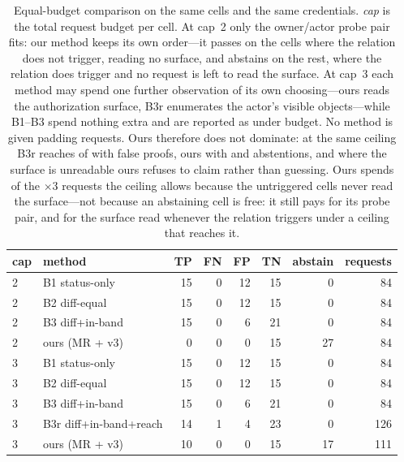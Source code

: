 \begin{table}[t]
\centering
\caption{Equal-budget comparison on the same \BgtCells{} cells and the same credentials. \emph{cap} is the total request budget per cell. At cap~2 only the owner/actor probe pair fits: our method keeps its own order---it passes on the \BgtOursPassCapTwo{} cells where the relation does not trigger, reading no surface, and abstains on the rest, where the relation does trigger and no request is left to read the surface. At cap~3 each method may spend one further observation of its own choosing---ours reads the authorization surface, B3r enumerates the actor's visible objects---while B1--B3 spend nothing extra and are reported as under budget. No method is given padding requests. Ours therefore does not dominate: at the same ceiling B3r reaches \BgtBthreeRTpCapThree{} of \BgtViolations{} with \BgtBthreeRFpCapThree{} false proofs, ours \BgtOursTpCapThree{} with \BgtOursFpCapThree{} and \BgtOursAbstainCapThree{} abstentions, and where the surface is unreadable ours refuses to claim rather than guessing. Ours spends \BgtOursReqCapThree{} of the \BgtCells{}$\times$3 requests the ceiling allows because the \BgtOursPassCapTwo{} untriggered cells never read the surface---not because an abstaining cell is free: it still pays for its probe pair, and for the surface read whenever the relation triggers under a ceiling that reaches it.}
\label{tab:budget}
\small
\begin{tabular*}{\textwidth}{@{\extracolsep{\fill}}llrrrrrr}
\toprule
cap & method & TP & FN & FP & TN & abstain & requests \\
\midrule
2 & B1 status-only & 15 & 0 & 12 & 15 & 0 & 84 \\
2 & B2 diff-equal & 15 & 0 & 12 & 15 & 0 & 84 \\
2 & B3 diff+in-band & 15 & 0 & 6 & 21 & 0 & 84 \\
2 & ours (MR + v3) & 0 & 0 & 0 & 15 & 27 & 84 \\
\midrule
3 & B1 status-only & 15 & 0 & 12 & 15 & 0 & 84 \\
3 & B2 diff-equal & 15 & 0 & 12 & 15 & 0 & 84 \\
3 & B3 diff+in-band & 15 & 0 & 6 & 21 & 0 & 84 \\
3 & B3r diff+in-band+reach & 14 & 1 & 4 & 23 & 0 & 126 \\
3 & ours (MR + v3) & 10 & 0 & 0 & 15 & 17 & 111 \\
\bottomrule
\end{tabular*}
\end{table}
